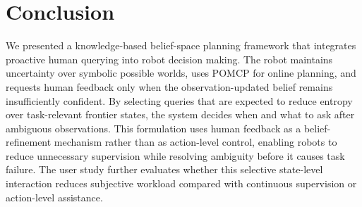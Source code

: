 \section{Conclusion}
\label{sec:conclusion}

We presented a knowledge-based belief-space planning framework that integrates proactive human querying into robot decision making. The robot maintains uncertainty over symbolic possible worlds, uses POMCP for online planning, and requests human feedback only when the observation-updated belief remains insufficiently confident. By selecting queries that are expected to reduce entropy over task-relevant frontier states, the system decides when and what to ask after ambiguous observations. This formulation uses human feedback as a belief-refinement mechanism rather than as action-level control, enabling robots to reduce unnecessary supervision while resolving ambiguity before it causes task failure. The user study further evaluates whether this selective state-level interaction reduces subjective workload compared with continuous supervision or action-level assistance.

